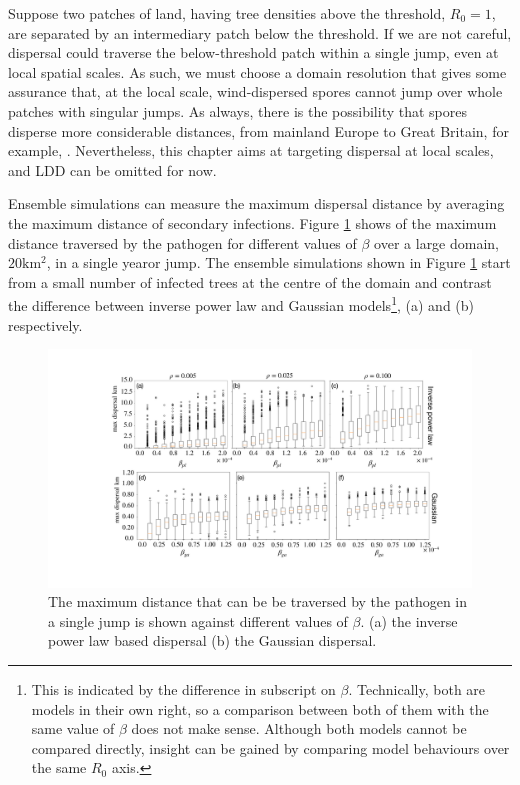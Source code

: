 Suppose two patches of land, having tree densities above the threshold, $R_0 = 1$, are separated by an intermediary patch below the threshold. If we are not careful, dispersal could traverse the below-threshold patch within a single jump, even at local spatial scales. As such, we must choose a domain resolution that gives some assurance that, at the local scale, wind-dispersed spores cannot jump over whole patches with singular jumps. As always, there is the possibility that spores disperse more considerable distances, from mainland Europe to Great Britain, for example, \cite{freer2017tree, wylder2018evidence}. Nevertheless, this chapter aims at targeting dispersal at local scales, and LDD can be omitted for now.

Ensemble simulations can measure the maximum dispersal distance by averaging the maximum distance of secondary infections. Figure \ref{fig:max_dist_vs_R0} shows of the maximum distance traversed by the pathogen for different values of $\beta$ over a large domain, $20\mathrm{km^2}$, in a single year\textemdash or jump. The ensemble simulations shown in Figure \ref{fig:max_dist_vs_R0} start from a small number of infected trees at the centre of the domain and contrast the difference between inverse power law and Gaussian models\footnote{This is indicated by the difference in subscript on $\beta$. Technically, both are models in their own right, so a comparison between both of them with the same value of $\beta$ does not make sense. Although both models cannot be compared directly, insight can be gained by comparing model behaviours over the same $R_0$ axis.}, (a) and (b) respectively. 
\begin{figure}
    \centering
    \includegraphics[scale=0.33]{chapter6/figures/fig5-beta-vs-max_d.pdf}
    \caption{The maximum distance that can be be traversed by the pathogen in a single jump is shown against different values of $\beta$. (a) the inverse power law based dispersal (b) the Gaussian dispersal.}  %
    \label{fig:max_dist_vs_R0}
\end{figure}

